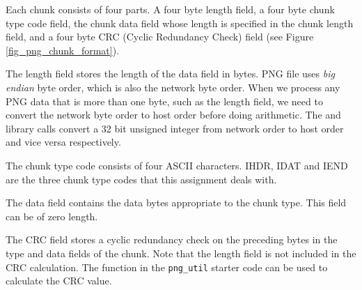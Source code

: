 Each chunk consists of four parts. A four byte length field, a four byte chunk type code field, the chunk data field whose length is specified in the chunk length field, and a four byte CRC (Cyclic Redundancy Check) field (see Figure \ref{fig_png_chunk_format}).

The length field stores the length of the data field in bytes. PNG file uses {\em big endian} byte order, which is also the network byte order. When we process any PNG data that is more than one byte, such as the length field, we need to convert the network byte order to host order before doing arithmetic. The  and  library calls convert a 32 bit unsigned integer from network order to host order and vice versa respectively.



The chunk type code consists of four ASCII characters. IHDR, IDAT and IEND are the three chunk type codes that this assignment deals with.

The data field contains the data bytes appropriate to the chunk type. This field can be of zero length.

The CRC field stores a cyclic redundancy check on the preceding bytes in the type and data fields of the chunk. Note that the length field is not included in the CRC calculation. The  function in the \verb+png_util+ starter code can be used to calculate the CRC value.

